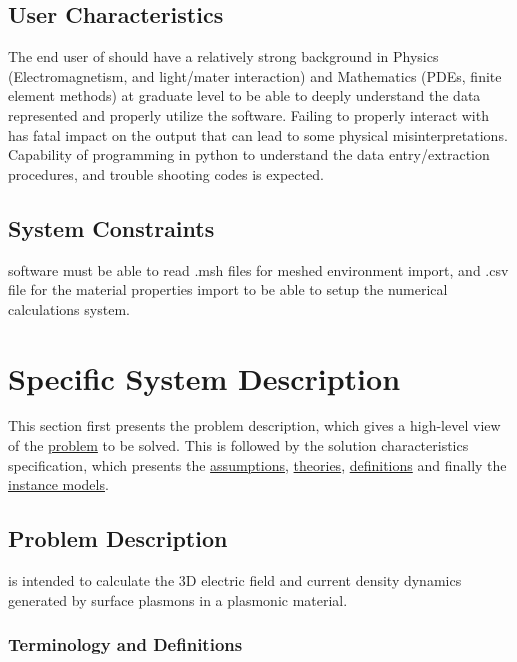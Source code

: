 \documentclass[12pt]{article}
\begin{document}
	\subsection{User Characteristics} \label{SecUserCharacteristics} The end user
of \progname{} should have a relatively strong background in  Physics
(Electromagnetism, and light/mater interaction) and Mathematics (PDEs, finite element methods) at
graduate level to be able to deeply understand the data represented and
properly utilize the software. Failing to properly interact with \progname{}
has fatal impact on the output that can lead to some physical
misinterpretations. Capability of programming in python to understand the data entry/extraction procedures, and trouble shooting codes is expected.
	
	
	
	
	\subsection{System Constraints} \progname software must be able to read .msh
	files for meshed environment import, and .csv file for the material properties
	import to be able to setup the numerical calculations system.
	
	\section{Specific System Description}
	
	This section first presents the problem description, which gives a high-level
	view of the \hyperref[Sec_pd]{problem} to be solved. This is followed by the
	solution characteristics specification, which presents the
	\hyperref[sec_assumpt]{assumptions}, \hyperref[sec_theoretical]{theories},
	\hyperref[sec_datadef]{definitions} and finally the
	\hyperref[sec_instance]{instance models}.
	
	\subsection{Problem Description} \label{Sec_pd}
	
	\progname{} is intended to calculate the 3D electric field and current density
	dynamics generated by surface plasmons in a plasmonic material.
	
	\subsubsection{Terminology and  Definitions}
	
\end{document}

